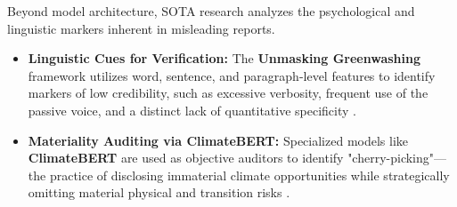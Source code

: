 \documentclass{article}
\begin{document}
Beyond model architecture, SOTA research analyzes the psychological and linguistic markers inherent in misleading reports.
\begin{itemize}
\item 

\textbf{Linguistic Cues for Verification:} The \textbf{Unmasking Greenwashing} framework utilizes word, sentence, and paragraph-level features to identify markers of low credibility, such as excessive verbosity, frequent use of the passive voice, and a distinct lack of quantitative specificity  \parencite{michelle_zhang_1fb1a57b}.\item 

\textbf{Materiality Auditing via ClimateBERT:} Specialized models like \textbf{ClimateBERT} are used as objective auditors to identify "cherry-picking"—the practice of disclosing immaterial climate opportunities while strategically omitting material physical and transition risks  \parencite{julia_bingler_268445e3}.
\end{itemize}
\end{document}
